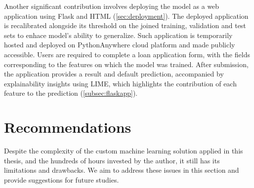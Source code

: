 Another significant contribution involves deploying the model as a web application using Flask and HTML (\autoref{sec:deployment}).
The deployed application is recalibrated alongside its threshold on the joined training, validation and test sets to enhace model's ability to generalize.
Such application is temporarily hosted and deployed on PythonAnywhere cloud platform and made publicly accessible.
Users are required to complete a loan application form, with the fields corresponding to the features on which the model was trained.
After submission, the application provides a result and default prediction, accompanied by explainability insights using LIME, which highlights the contribution of each feature to the prediction (\autoref{subsec:flaskapp}).


\section{Recommendations}
\label{sec:recommendations}
Despite the complexity of the custom machine learning solution applied in this thesis, and the hundreds of hours invested by the author, it still has its limitations and drawbacks. We aim to address these issues in this section and provide suggestions for future studies.
